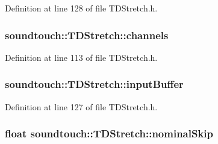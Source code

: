 Definition at line 128 of file T\+D\+Stretch.\+h.

\subsubsection[{\texorpdfstring{channels}{channels}}]{ soundtouch\+::\+T\+D\+Stretch\+::channels\hspace{0.3cm}{\ttfamily [protected]}}\hypertarget{classsoundtouch_1_1_t_d_stretch_a8a19ab5d68efd8f21fe88e6d2fc9e2c8}{}\label{classsoundtouch_1_1_t_d_stretch_a8a19ab5d68efd8f21fe88e6d2fc9e2c8}


Definition at line 113 of file T\+D\+Stretch.\+h.

\subsubsection[{\texorpdfstring{input\+Buffer}{inputBuffer}}]{ soundtouch\+::\+T\+D\+Stretch\+::input\+Buffer\hspace{0.3cm}{\ttfamily [protected]}}\hypertarget{classsoundtouch_1_1_t_d_stretch_a97d5742c0d2f30248733168172d54d03}{}\label{classsoundtouch_1_1_t_d_stretch_a97d5742c0d2f30248733168172d54d03}


Definition at line 127 of file T\+D\+Stretch.\+h.

\subsubsection[{\texorpdfstring{nominal\+Skip}{nominalSkip}}]{\setlength{\rightskip}{0pt plus 5cm}float soundtouch\+::\+T\+D\+Stretch\+::nominal\+Skip\hspace{0.3cm}{\ttfamily [protected]}}\hypertarget{classsoundtouch_1_1_t_d_stretch_a53b938868679a0ce730946f53f843403}{}\label{classsoundtouch_1_1_t_d_stretch_a53b938868679a0ce730946f53f843403}



